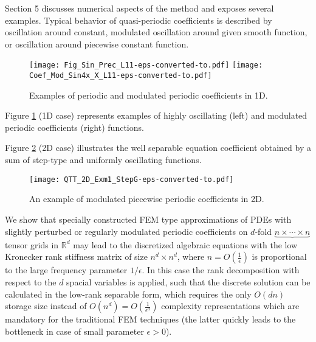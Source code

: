 \documentclass[amstex,amstext,amsfonts,epsf,12pt] {amsart}
\begin{document}
Section 5 discusses numerical aspects of the method and exposes several
examples. Typical behavior of  quasi-periodic coefficients is described by 
oscillation around constant, modulated oscillation around given smooth function, 
or oscillation around piecewise constant function. 
\begin{figure}[htbp]
\texttt{[image: Fig\_Sin\_Prec\_L11-eps-converted-to.pdf]}
\texttt{[image: Coef\_Mod\_Sin4x\_X\_L11-eps-converted-to.pdf]}
\caption{\small Examples of periodic and modulated periodic coefficients in 1D.
}
\label{fig:1DPeriodStruct2}
\end{figure}

Figure \ref{fig:1DPeriodStruct2} (1D case)
represents examples of highly oscillating (left) and modulated periodic coefficients (right) functions.


Figure \ref{fig:2DPeriodStruct2} (2D case) illustrates the well separable equation 
coefficient obtained by a sum of step-type and uniformly oscillating functions.

\begin{figure}[htbp]
\texttt{[image: QTT\_2D\_Exm1\_StepG-eps-converted-to.pdf]}
\caption{\small An example of modulated piecewise periodic coefficients in 2D.
}
\label{fig:2DPeriodStruct2}
\end{figure}

We show that specially constructed FEM type approximations of PDEs with 
slightly perturbed or regularly modulated periodic coefficients on $d$-fold 
 $\underbrace{n\times \cdots \times n}$  tensor 
grids in $\mathbb{R}^d$ may lead to the discretized algebraic
equations with the low Kronecker rank stiffness matrix of size $n^d \times n^d$, where 
$n=O(\frac{1}{\epsilon})$ is proportional to the large frequency parameter $1/\epsilon$. 
In this case the rank decomposition with respect to the $d$ spacial variables is applied,
such that the discrete solution can be calculated in the low-rank separable form,
which requires the only $O(dn)$ storage size instead of $O(n^d)=O(\frac{1}{\epsilon^d})$ 
complexity representations which are mandatory for the traditional FEM techniques 
(the latter quickly leads to the bottleneck in case of small parameter $\epsilon>0$). 
\end{document}
